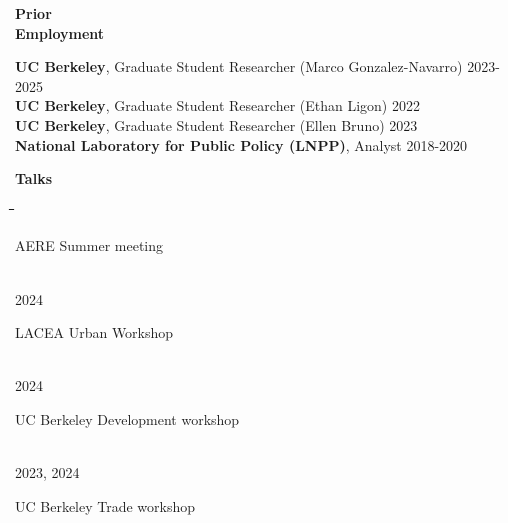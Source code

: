 \documentclass[10pt, oneside]{article}
\makeatletter
\newlength\tdima
\newcommand\tabfill[1]{%
      \setlength\tdima{\linewidth}%
      \addtolength\tdima{\@totalleftmargin}%
      \addtolength\tdima{-\dimen\@curtab}%
      \parbox[t]{\tdima}{#1\ifhmode\strut\fi}}
\newcommand\mytabs{\hspace*{1cm}\=\hspace{1cm}\=\hspace{1cm}\=\hspace{1cm}\=\hspace{1cm}\=\hspace{1cm}\=\hspace{1cm}\=\hspace{1cm}\=\hspace{1cm}\=\hspace{1cm}}
\newenvironment{mysec}[1][\mytabs]
  {\begin{tabbing}#1\kill\ignorespaces}
  {\end{tabbing}}
\makeatother
\begin{document}
\begin{minipage}[t]{0.1\linewidth}
\textbf{Prior \\ Employment}
\end{minipage}\hspace{0.05\linewidth}
\begin{minipage}[t]{0.8\linewidth}
\textbf{UC Berkeley}, Graduate Student Researcher (Marco Gonzalez-Navarro) \hfill 2023-2025 \\
\textbf{UC Berkeley}, Graduate Student Researcher (Ethan Ligon) \hfill 2022 \\
\textbf{UC Berkeley}, Graduate Student Researcher (Ellen Bruno) \hfill 2023 \\
\textbf{National Laboratory for Public Policy (LNPP)}, Analyst \hfill 2018-2020 \\
\end{minipage}\vspace{5mm}

\begin{minipage}[t]{0.1\linewidth}
\textbf{Talks}
\end{minipage}\hspace{0.05\linewidth}
\begin{minipage}[t]{0.8\linewidth}
\begin{mysec} 
    2025 \>\> \tabfill{AERE Summer meeting} \\
	2024 \>\> \tabfill{LACEA Urban Workshop} \\
    2024 \>\> \tabfill{UC Berkeley Development workshop} \\
    2023, 2024 \>\> \tabfill{UC Berkeley Trade workshop} \\
\end{mysec} 
\end{minipage}\vspace{5mm}

\end{document}
